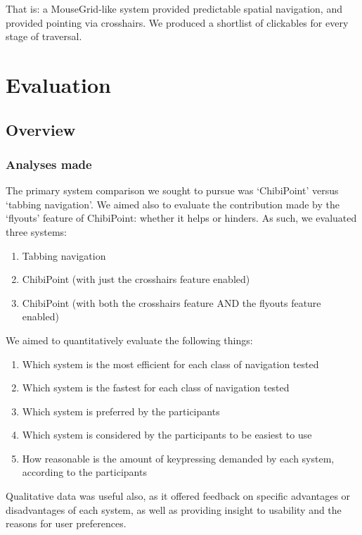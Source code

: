 \documentclass[11pt,openright,a4paper]{report}
\begin{document}
That is: a MouseGrid-like system provided predictable spatial navigation, and provided pointing via crosshairs. We produced a shortlist of clickables for every stage of traversal.

\chapter{Evaluation}
\label{chap:evaluation}
\section{Overview}
\subsection{Analyses made}
The primary system comparison we sought to pursue was `ChibiPoint' versus `tabbing navigation'. We aimed also to evaluate the contribution made by the `flyouts' feature of ChibiPoint: whether it helps or hinders. As such, we evaluated three systems:
\begin{enumerate}
\item Tabbing navigation
\item ChibiPoint (with just the crosshairs feature enabled)
\item ChibiPoint (with both the crosshairs feature AND the flyouts feature enabled)
\end{enumerate}

We aimed to quantitatively evaluate the following things:
\begin{enumerate}
\item Which system is the most efficient for each class of navigation tested
\item Which system is the fastest for each class of navigation tested
\item Which system is preferred by the participants
\item Which system is considered by the participants to be easiest to use
\item How reasonable is the amount of keypressing demanded by each system, according to the participants
\end{enumerate}

Qualitative data was useful also, as it offered feedback on specific advantages or disadvantages of each system, as well as providing insight to usability and the reasons for user preferences.
\end{document}
